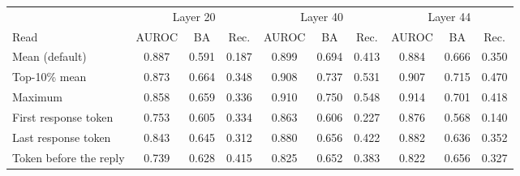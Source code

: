 \begin{tabular}{lccccccccc}
\toprule
 & \multicolumn{3}{c}{Layer 20} & \multicolumn{3}{c}{Layer 40} & \multicolumn{3}{c}{Layer 44} \\
\cmidrule(lr){2-4}\cmidrule(lr){5-7}\cmidrule(lr){8-10}
Read & AUROC & BA & Rec. & AUROC & BA & Rec. & AUROC & BA & Rec. \\
\midrule
Mean (default) & 0.887 & 0.591 & 0.187 & 0.899 & 0.694 & 0.413 & 0.884 & 0.666 & 0.350 \\
Top-10\% mean & 0.873 & 0.664 & 0.348 & 0.908 & 0.737 & 0.531 & 0.907 & 0.715 & 0.470 \\
Maximum & 0.858 & 0.659 & 0.336 & 0.910 & 0.750 & 0.548 & 0.914 & 0.701 & 0.418 \\
First response token & 0.753 & 0.605 & 0.334 & 0.863 & 0.606 & 0.227 & 0.876 & 0.568 & 0.140 \\
Last response token & 0.843 & 0.645 & 0.312 & 0.880 & 0.656 & 0.422 & 0.882 & 0.636 & 0.352 \\
Token before the reply & 0.739 & 0.628 & 0.415 & 0.825 & 0.652 & 0.383 & 0.822 & 0.656 & 0.327 \\
\bottomrule
\end{tabular}